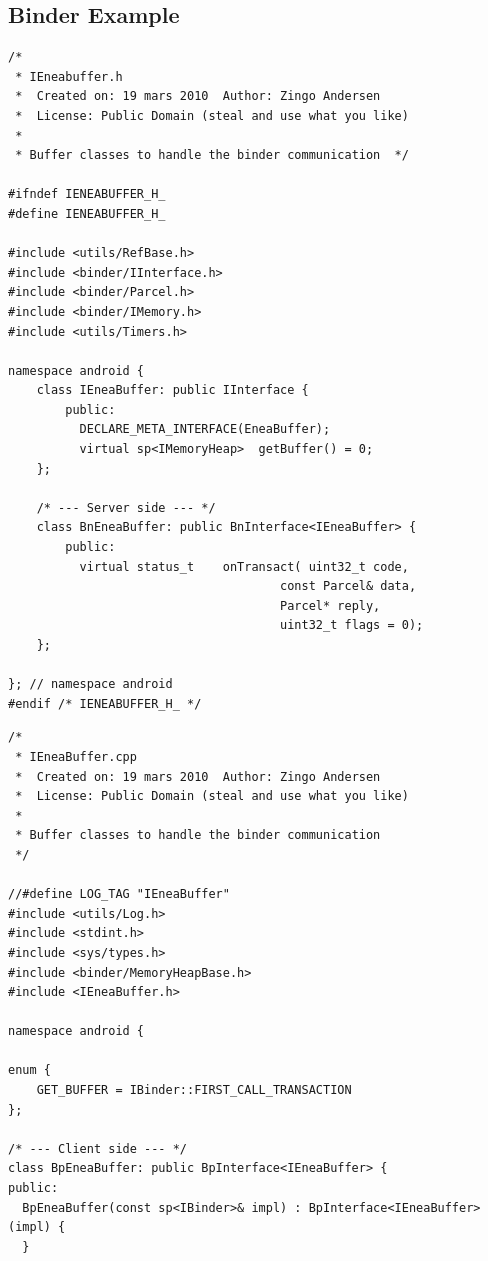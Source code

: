 \documentclass[a4paper,11pt]{article}
\begin{document}
\appendix
{}
\begin{appendices}
    \section{Binder Example} \label{eneabuffer}
\begin{lstlisting}[caption=Interface header: IEneaBuffer.h,label={IEneaBufferHeader}]
/*
 * IEneabuffer.h
 *  Created on: 19 mars 2010  Author: Zingo Andersen
 *  License: Public Domain (steal and use what you like)
 *
 * Buffer classes to handle the binder communication  */

#ifndef IENEABUFFER_H_
#define IENEABUFFER_H_

#include <utils/RefBase.h>
#include <binder/IInterface.h>
#include <binder/Parcel.h>
#include <binder/IMemory.h>
#include <utils/Timers.h>

namespace android {
    class IEneaBuffer: public IInterface {
        public:
          DECLARE_META_INTERFACE(EneaBuffer);
          virtual sp<IMemoryHeap>  getBuffer() = 0;
    };

    /* --- Server side --- */
    class BnEneaBuffer: public BnInterface<IEneaBuffer> {
        public:
          virtual status_t    onTransact( uint32_t code,
                                      const Parcel& data,
                                      Parcel* reply,
                                      uint32_t flags = 0);
    };

}; // namespace android
#endif /* IENEABUFFER_H_ */
\end{lstlisting}

\begin{lstlisting}[caption=Interface class: IEneaBuffer.cpp, label=IEneaBufferCPP]
/*
 * IEneaBuffer.cpp
 *  Created on: 19 mars 2010  Author: Zingo Andersen
 *  License: Public Domain (steal and use what you like)
 *
 * Buffer classes to handle the binder communication
 */

//#define LOG_TAG "IEneaBuffer"
#include <utils/Log.h>
#include <stdint.h>
#include <sys/types.h>
#include <binder/MemoryHeapBase.h>
#include <IEneaBuffer.h>

namespace android {

enum {
    GET_BUFFER = IBinder::FIRST_CALL_TRANSACTION
};

/* --- Client side --- */
class BpEneaBuffer: public BpInterface<IEneaBuffer> {
public:
  BpEneaBuffer(const sp<IBinder>& impl) : BpInterface<IEneaBuffer>(impl) {
  }


\end{lstlisting}
\end{appendices}
\end{document}
